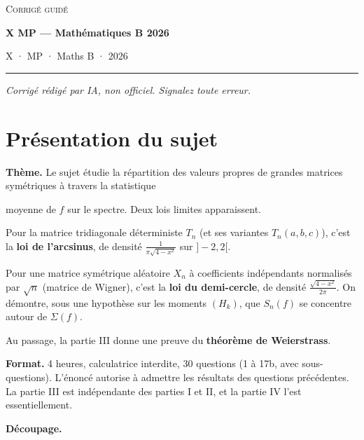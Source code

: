 \documentclass[11pt,a4paper]{article}
\newcommand{\equationajustee}[1]{%
  \sbox{\boiteequation}{$\displaystyle #1$}%
  \ifdim\wd\boiteequation>\linewidth
    \[\resizebox{\linewidth}{!}{\usebox{\boiteequation}}\]%
  \else
    \[#1\]%
  \fi}
\begin{document}
\thispagestyle{plain}
\begin{center}
  {\small\scshape Corrigé guidé}\par\smallskip
  {\LARGE\bfseries X MP — Mathématiques B 2026\par}\medskip
  {\large X · MP · Maths B · 2026\par}
\end{center}
\vspace{2pt}\hrule\vspace{8pt}

\emph{Corrigé rédigé par IA, non officiel. Signalez toute erreur.}

\hypertarget{pruxe9sentation-du-sujet}{%
\section{Présentation du sujet}\label{pruxe9sentation-du-sujet}}

\textbf{Thème.} Le sujet étudie la répartition des valeurs propres de grandes matrices symétriques à travers la statistique

\equationajustee{S_f(M)=\frac1n\sum_{(\lambda,m_\lambda)\in\mathrm{Sp}(M)}m_\lambda f(\lambda),}

moyenne de \(f\) sur le spectre. Deux lois limites apparaissent.

Pour la matrice tridiagonale déterministe \(T_n\) (et ses variantes \(T_n(a,b,c)\)), c'est la \textbf{loi de l'arcsinus}, de densité \(\frac{1}{\pi\sqrt{4-x^2}}\) sur \(]-2,2[\).

Pour une matrice symétrique aléatoire \(X_n\) à coefficients indépendants normalisés par \(\sqrt n\) (matrice de Wigner), c'est la \textbf{loi du demi-cercle}, de densité \(\frac{\sqrt{4-x^2}}{2\pi}\). On démontre, sous une hypothèse sur les moments \((H_k)\), que \(S_n(f)\) se concentre autour de \(\Sigma(f)\).

Au passage, la partie III donne une preuve du \textbf{théorème de Weierstrass}.

\textbf{Format.} 4 heures, calculatrice interdite, 30 questions (1 à 17b, avec sous-questions). L'énoncé autorise à admettre les résultats des questions précédentes. La partie III est indépendante des parties I et II, et la partie IV l'est essentiellement.

\textbf{Découpage.}
\end{document}
